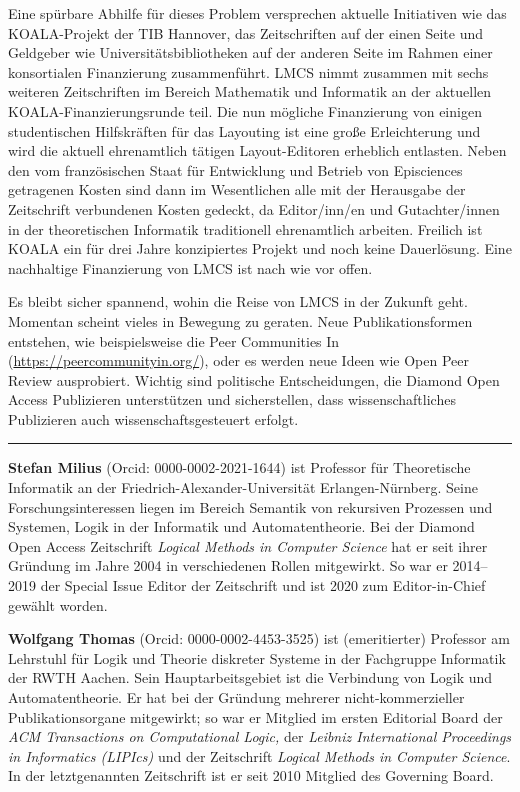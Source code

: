 \documentclass[a4paper,
fontsize=11pt,
oneside,
numbers=noperiodatend,
parskip=half-,
bibliography=totoc,
final
]{scrartcl}
\begin{document}
Eine spürbare Abhilfe für dieses Problem versprechen aktuelle
Initiativen wie das KOALA-Projekt der TIB Hannover, das Zeitschriften
auf der einen Seite und Geldgeber wie Universitätsbibliotheken auf der
anderen Seite im Rahmen einer konsortialen Finanzierung zusammenführt.
LMCS nimmt zusammen mit sechs weiteren Zeitschriften im Bereich
Mathematik und Informatik an der aktuellen KOALA-Finanzierungsrunde
teil. Die nun mögliche Finanzierung von einigen studentischen
Hilfskräften für das Layouting ist eine große Erleichterung und wird die
aktuell ehrenamtlich tätigen Layout-Editoren erheblich entlasten. Neben
den vom französischen Staat für Entwicklung und Betrieb von Episciences
getragenen Kosten sind dann im Wesentlichen alle mit der Herausgabe der
Zeitschrift verbundenen Kosten gedeckt, da Editor/inn/en und
Gutachter/innen in der theoretischen Informatik traditionell
ehrenamtlich arbeiten. Freilich ist KOALA ein für drei Jahre
konzipiertes Projekt und noch keine Dauerlösung. Eine nachhaltige
Finanzierung von LMCS ist nach wie vor offen.

Es bleibt sicher spannend, wohin die Reise von LMCS in der Zukunft geht.
Momentan scheint vieles in Bewegung zu geraten. Neue Publikationsformen
entstehen, wie beispielsweise die Peer Communities In
(\url{https://peercommunityin.org/}), oder es werden neue Ideen wie Open
Peer Review ausprobiert. Wichtig sind politische Entscheidungen, die
Diamond Open Access Publizieren unterstützen und sicherstellen, dass
wissenschaftliches Publizieren auch wissenschaftsgesteuert erfolgt.

\begin{center}\rule{0.5\linewidth}{0.5pt}\end{center}

\textbf{Stefan Milius} (Orcid: 0000-0002-2021-1644) ist Professor für
Theoretische Informatik an der Friedrich-Alexander-Universität
Erlangen-Nürnberg. Seine Forschungsinteressen liegen im Bereich Semantik
von rekursiven Prozessen und Systemen, Logik in der Informatik und
Automatentheorie. Bei der Diamond Open Access Zeitschrift \emph{Logical
Methods in Computer Science} hat er seit ihrer Gründung im Jahre 2004 in
verschiedenen Rollen mitgewirkt. So war er 2014--2019 der Special Issue
Editor der Zeitschrift und ist 2020 zum Editor-in-Chief gewählt worden.

\textbf{Wolfgang Thomas} (Orcid: 0000-0002-4453-3525) ist (emeritierter)
Professor am Lehrstuhl für Logik und Theorie diskreter Systeme in der
Fachgruppe Informatik der RWTH Aachen. Sein Hauptarbeitsgebiet ist die
Verbindung von Logik und Automatentheorie. Er hat bei der Gründung
mehrerer nicht-kommerzieller Publikationsorgane mitgewirkt; so war er
Mitglied im ersten Editorial Board der \emph{ACM Transactions on
Computational Logic,} der \emph{Leibniz International Proceedings in
Informatics (LIPIcs)} und der Zeitschrift \emph{Logical Methods in
Computer Science}. In der letztgenannten Zeitschrift ist er seit 2010
Mitglied des Governing Board.
\end{document}
